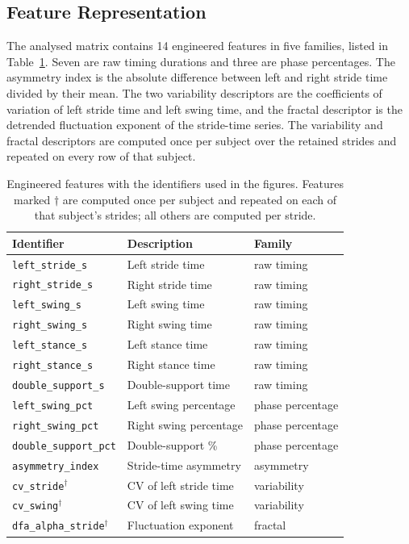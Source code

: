 \documentclass[conference]{IEEEtran}
\begin{document}
\subsection{Feature Representation}
\label{sec:data-features}
The analysed matrix contains 14 engineered features in five families, listed in Table~\ref{tab:features}. Seven are raw timing durations and three are phase percentages. The asymmetry index is the absolute difference between left and right stride time divided by their mean. The two variability descriptors are the coefficients of variation of left stride time and left swing time, and the fractal descriptor is the detrended fluctuation exponent of the stride-time series. The variability and fractal descriptors are computed once per subject over the retained strides and repeated on every row of that subject.

\begin{table}[t]
\caption{Engineered features with the identifiers used in the figures. Features marked $\dagger$ are computed once per subject and repeated on each of that subject's strides; all others are computed per stride.}
\label{tab:features}
\centering
\footnotesize
\setlength{\tabcolsep}{3pt}
\begin{tabular}{lll}
\toprule
Identifier & Description & Family \\
\midrule
\texttt{left\_stride\_s} & Left stride time & raw timing \\
\texttt{right\_stride\_s} & Right stride time & raw timing \\
\texttt{left\_swing\_s} & Left swing time & raw timing \\
\texttt{right\_swing\_s} & Right swing time & raw timing \\
\texttt{left\_stance\_s} & Left stance time & raw timing \\
\texttt{right\_stance\_s} & Right stance time & raw timing \\
\texttt{double\_support\_s} & Double-support time & raw timing \\
\texttt{left\_swing\_pct} & Left swing percentage & phase percentage \\
\texttt{right\_swing\_pct} & Right swing percentage & phase percentage \\
\texttt{double\_support\_pct} & Double-support \% & phase percentage \\
\texttt{asymmetry\_index} & Stride-time asymmetry & asymmetry \\
\texttt{cv\_stride}$^\dagger$ & CV of left stride time & variability \\
\texttt{cv\_swing}$^\dagger$ & CV of left swing time & variability \\
\texttt{dfa\_alpha\_stride}$^\dagger$ & Fluctuation exponent & fractal \\
\bottomrule
\end{tabular}
\end{table}
\end{document}
